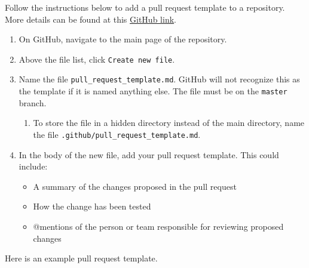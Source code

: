 \documentclass[]{book}
\providecommand{\tightlist}{%
  \setlength{\itemsep}{0pt}\setlength{\parskip}{0pt}}
\begin{document}
Follow the instructions below to add a pull request template to a
repository. More details can be found at this
\href{https://help.github.com/en/github/building-a-strong-community/creating-a-pull-request-template-for-your-repository}{GitHub
link}.

\begin{enumerate}
\def\labelenumi{\arabic{enumi}.}
\tightlist
\item
  On GitHub, navigate to the main page of the repository.
\item
  Above the file list, click \texttt{Create\ new\ file}.
\item
  Name the file \texttt{pull\_request\_template.md}. GitHub will not
  recognize this as the template if it is named anything else. The file
  must be on the \texttt{master} branch.

  \begin{enumerate}
  \def\labelenumii{\arabic{enumii}.}
  \tightlist
  \item
    To store the file in a hidden directory instead of the main
    directory, name the file
    \texttt{.github/pull\_request\_template.md}.
  \end{enumerate}
\item
  In the body of the new file, add your pull request template. This
  could include:

  \begin{itemize}
  \tightlist
  \item
    A summary of the changes proposed in the pull request
  \item
    How the change has been tested
  \item
    @mentions of the person or team responsible for reviewing proposed
    changes
  \end{itemize}
\end{enumerate}

Here is an example pull request template.
\end{document}
